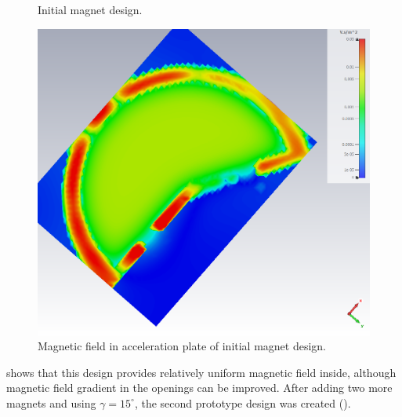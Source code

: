 \documentclass[a4paper,oneside,12pt]{report}
\numberwithin{equation}{chapter}
\begin{document}
\begin{figure}[H]
    \centering
    \qquad{}%
    \vspace{20pt}
    \caption{\centering Initial magnet design.} 
    \label{fig:initial_magnet_design}
\end{figure}
\vspace{20pt}
\begin{figure}[H]
    \centering
    \includegraphics[width=.8\linewidth]{./figures/cst/cst_first_magnet_design3.png}
    \vspace{20pt}
    \caption{Magnetic field in acceleration plate of initial magnet design.}
    \label{fig:initial_magnet_design_B}
\end{figure}
\clearpage
{} shows that this design provides relatively uniform magnetic field inside, although magnetic field gradient in the openings can be improved.
After adding two more magnets and using $\gamma=15^\circ$, the second prototype design was created ().
\end{document}
